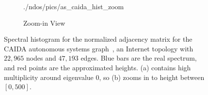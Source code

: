 \begin{figure}[ht]
\begin{center}
\begin{subfigure}{0.47\textwidth}
      {./ndos/pics/as_caida_hist_zoom}
      \caption{Zoom-in View}
      \label{fig:caida_zoom}
    \end{subfigure}
    \caption{Spectral histogram for the normalized adjacency matrix for the
    CAIDA autonomous systems graph~\cite{caida2012}, an Internet topology with
    $22,965$ nodes and $47,193$ edges. Blue bars are the real spectrum, and red
    points are the approximated heights. (a) contains high multiplicity around
    eigenvalue $0$, so (b) zooms in to height between $[0,500]$.} 
    \label{fig:caida}
  \end{center}
\end{figure}
\vspace{-.5cm}